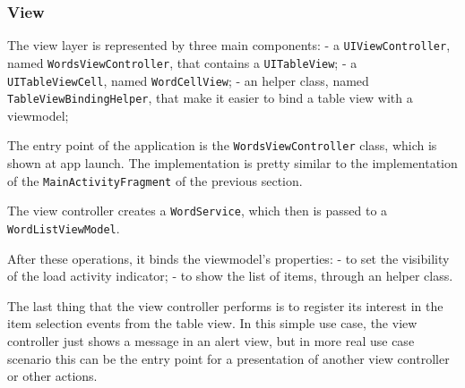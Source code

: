 \subsubsection{View}\label{view}

The view layer is represented by three main components: - a
\texttt{UIViewController}, named \texttt{WordsViewController}, that
contains a \texttt{UITableView}; - a \texttt{UITableViewCell}, named
\texttt{WordCellView}; - an helper class, named
\texttt{TableViewBindingHelper}, that make it easier to bind a table
view with a viewmodel;

The entry point of the application is the \texttt{WordsViewController}
class, which is shown at app launch. The implementation is pretty similar
to the implementation of the \texttt{MainActivityFragment} of the
previous section.

The view controller creates a \texttt{WordService}, which then is passed
to a \texttt{WordListViewModel}.

After these operations, it binds the viewmodel's properties: - to set the
visibility of the load activity indicator; - to show the list of items,
through an helper class.

The last thing that the view controller performs is to register its
interest in the item selection events from the table view. In this
simple use case, the view controller just shows a message in an alert
view, but in more real use case scenario this can be the entry point for
a presentation of another view controller or other actions.


